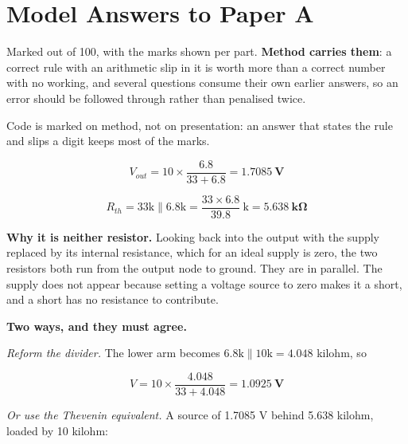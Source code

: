 
\renewcommand{\answerprefix}{ansa}

\chapter{Model Answers to Paper A}
\label{ansa:ch:answers}

Marked out of 100, with the marks shown per part. \textbf{Method carries them}: a
correct rule with an arithmetic slip in it is worth more than a correct number with no
working, and several questions consume their own earlier answers, so an error should be
followed through rather than penalised twice.

Code is marked on method, not on presentation: an answer that states the
rule and slips a digit keeps most of the marks.



\[
  V_{out} = 10 \times \frac{6.8}{33 + 6.8} = \mathbf{1.7085\ \text{V}}
\]

\[
  R_{th} = 33\text{k} \parallel 6.8\text{k} = \frac{33 \times 6.8}{39.8}\ \text{k}
  = \mathbf{5.638\ \text{k}\Omega}
\]

\textbf{Why it is neither resistor.} Looking back into the output with the supply replaced by its internal resistance, which for an ideal supply is zero, the two resistors both run from the output node to ground. They are in parallel. The supply does not appear because setting a voltage source to zero makes it a short, and a short has no resistance to contribute.


\textbf{Two ways, and they must agree.}

\emph{Reform the divider.} The lower arm becomes $6.8\text{k} \parallel 10\text{k} = 4.048$ kilohm, so

\[
  V = 10 \times \frac{4.048}{33 + 4.048} = \mathbf{1.0925\ \text{V}}
\]

\emph{Or use the Thevenin equivalent.} A source of 1.7085 V behind 5.638 kilohm, loaded by 10 kilohm:

